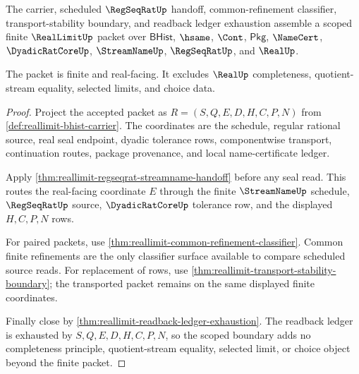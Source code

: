 \begin{theorem}
\label{thm:reallimit-scoped-window-boundary}
The carrier, scheduled $\RegSeqRatUp$ handoff, common-refinement classifier,
transport-stability boundary, and readback ledger exhaustion assemble a scoped
finite $\RealLimitUp$ packet over $\mathsf{BHist}$, $\hsame$, $\Cont$,
$\mathsf{Pkg}$, $\NameCert$, $\DyadicRatCoreUp$, $\StreamNameUp$,
$\RegSeqRatUp$, and $\RealUp$.

The packet is finite and real-facing. It excludes $\RealUp$ completeness,
quotient-stream equality, selected limits, and choice data.
\end{theorem}
\begin{proof}
Project the accepted packet as $R=(S,Q,E,D,H,C,P,N)$ from
\autoref{def:reallimit-bhist-carrier}. The coordinates are the schedule,
regular rational source, real seal endpoint, dyadic tolerance rows,
componentwise transport, continuation routes, package provenance, and local
name-certificate ledger.

Apply \autoref{thm:reallimit-regseqrat-streamname-handoff} before any seal
read. This routes the real-facing coordinate $E$ through the finite
$\StreamNameUp$ schedule, $\RegSeqRatUp$ source, $\DyadicRatCoreUp$ tolerance
row, and the displayed $H,C,P,N$ rows.

For paired packets, use
\autoref{thm:reallimit-common-refinement-classifier}. Common finite
refinements are the only classifier surface available to compare scheduled
source reads. For replacement of rows, use
\autoref{thm:reallimit-transport-stability-boundary}; the transported packet
remains on the same displayed finite coordinates.

Finally close by \autoref{thm:reallimit-readback-ledger-exhaustion}. The
readback ledger is exhausted by $S,Q,E,D,H,C,P,N$, so the scoped boundary adds
no completeness principle, quotient-stream equality, selected limit, or choice
object beyond the finite packet.
\end{proof}

